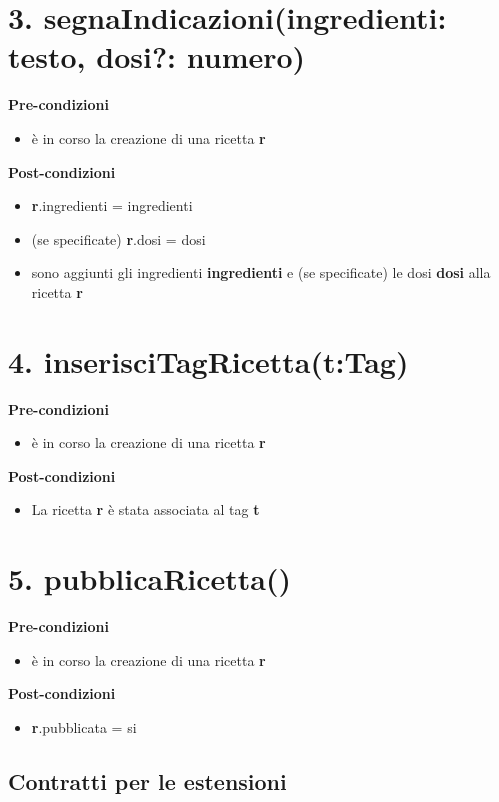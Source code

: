 \documentclass[12pt]{extarticle}
\begin{document}
\section*{3. segnaIndicazioni(ingredienti: testo, dosi?: numero)}

\textbf{Pre-condizioni}
\begin{itemize}
  \item è in corso la creazione di una ricetta  \textbf{r}
\end{itemize}
\textbf{Post-condizioni}
\begin{itemize}
    \item \textbf{r}.ingredienti = ingredienti
    \item (se specificate) \textbf{r}.dosi = dosi
    \item sono aggiunti gli ingredienti  \textbf{ingredienti} e (se specificate) le dosi  \textbf{dosi} alla ricetta \textbf{r}
\end{itemize}



\section*{4. inserisciTagRicetta(t:Tag)}

\textbf{Pre-condizioni}
\begin{itemize}
  \item è in corso la creazione di una ricetta  \textbf{r}
\end{itemize}
\textbf{Post-condizioni}
\begin{itemize}
  \item La ricetta  \textbf{r} è stata associata al tag \textbf{t} 
\end{itemize}

\section*{5. pubblicaRicetta()}

\textbf{Pre-condizioni}
\begin{itemize}
  \item è in corso la creazione di una ricetta  \textbf{r}
\end{itemize}
\textbf{Post-condizioni}
\begin{itemize}
  \item \textbf{r}.pubblicata = si
\end{itemize}

\newpage
\begin{center}
  \section*{Contratti per le estensioni}
\end{center}
\end{document}
